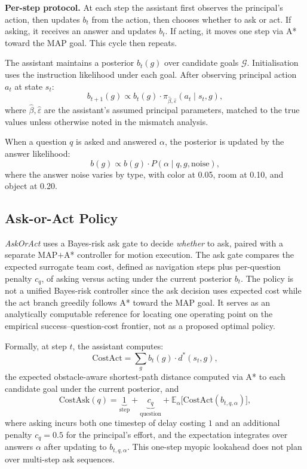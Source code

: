 \documentclass[10pt,twocolumn]{article}
\begin{document}
\textbf{Per-step protocol.}
At each step the assistant first observes the principal's action, then updates $b_t$ from the action, then chooses whether to ask or act. If asking, it receives an answer and updates $b_t$. If acting, it moves one step via A* toward the MAP goal. This cycle then repeats.

The assistant maintains a posterior $b_t(g)$ over candidate goals $\mathcal{G}$.
Initialisation uses the instruction likelihood under each goal.
After observing principal action $a_t$ at state $s_t$:
\[
  b_{t+1}(g) \propto b_t(g) \cdot \pi_{\hat\beta,\hat\varepsilon}(a_t \mid s_t, g),
\]
where $\hat\beta, \hat\varepsilon$ are the assistant's assumed principal parameters, matched to the true values unless otherwise noted in the mismatch analysis.

When a question $q$ is asked and answered $\alpha$, the posterior is updated by the answer likelihood:
\[
  b(g) \propto b(g) \cdot P(\alpha \mid q, g, \text{noise}),
\]
where the answer noise varies by type, with color at 0.05, room at 0.10, and object at 0.20.

\subsection{Ask-or-Act Policy}

\textit{AskOrAct} uses a Bayes-risk ask gate to decide \emph{whether} to ask, paired with a separate MAP$+$A* controller for motion execution.
The ask gate compares the expected surrogate team cost, defined as navigation steps plus per-question penalty $c_q$, of asking versus acting under the current posterior $b_t$.
The policy is not a unified Bayes-risk controller since the ask decision uses expected cost while the act branch greedily follows A* toward the MAP goal.
It serves as an analytically computable reference for locating one operating point on the empirical success--question-cost frontier, not as a proposed optimal policy.

Formally, at step $t$, the assistant computes:
\[
  \text{CostAct} = \sum_{g} b_t(g) \cdot d^*(s_t, g),
\]
the expected obstacle-aware shortest-path distance computed via A* to each candidate goal under the current posterior, and
\[
  \text{CostAsk}(q) = \underbrace{1}_{\text{step}} + \underbrace{c_q}_{\text{question}} + \mathbb{E}_{\alpha}\bigl[\text{CostAct}(b_{t,q,\alpha})\bigr],
\]
where asking incurs both one timestep of delay costing $1$ and an additional penalty $c_q = 0.5$ for the principal's effort, and the expectation integrates over answers $\alpha$ after updating to $b_{t,q,\alpha}$.
This one-step myopic lookahead does not plan over multi-step ask sequences.
\end{document}
